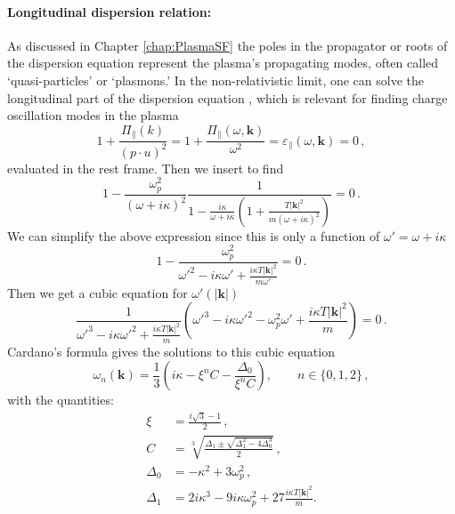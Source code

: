 \paragraph{Longitudinal dispersion relation:}
As discussed in Chapter \ref{chap:PlasmaSF} the poles in the propagator or roots of the dispersion equation represent the plasma's propagating modes, often called `quasi-particles' or `plasmons.' In the non-relativistic limit, one can solve the longitudinal part of the dispersion equation , which is relevant for finding charge oscillation modes in the plasma
\begin{equation}
    1+ \frac{\Pi_\parallel( k)}{(p\cdot u)^2}= 1+ \frac{\Pi_\parallel(\omega, \boldsymbol{k})}{\omega^2}=\varepsilon_\parallel(\omega,\boldsymbol{k}) =0 \,,
\end{equation}
evaluated in the rest frame. Then we insert  to find
\begin{equation}
   1- \frac{\omega_p^2}{(\omega+ i \kappa)^2} \frac{1}{1-\frac{i\kappa}{\omega+ i \kappa}\left(1+\frac{T |\boldsymbol{k}|^2}{m(\omega+ i \kappa)^2} \right)}=0 \,.
\end{equation}
We can simplify the above expression since this is only a function of $\omega' =\omega+i\kappa$
\begin{equation}
   1- \frac{\omega_p^2}{\omega'^2-i\kappa\omega'+\frac{i\kappa T |\boldsymbol{k}|^2}{m \omega'} }=0 \,.
\end{equation}
Then we get a cubic equation for $\omega'(|\boldsymbol{k}|)$
\begin{equation}\label{eq:dispfact}
   \frac{1}{\omega'^3-i\kappa\omega'^2+\frac{i\kappa T |\boldsymbol{k}|^2}{m} }
    \left(\omega'^3-i\kappa\omega'^2 - \omega_p^2\omega'+\frac{i\kappa T |\boldsymbol{k}|^2}{m} \right)=0 \,.
\end{equation}
Cardano's formula gives the solutions to this cubic equation
\begin{equation}\label{eq:cardano}
\omega_n(\boldsymbol{k}) = \frac{1}{3}\left(i\kappa-\xi^n C-\frac{\Delta_0}{\xi^n C}\right), \qquad n \in \{0,1,2\} \,,
\end{equation}
with the quantities:
\begin{align}\label{eq:delta}
  \xi &=\frac{i\sqrt{3}-1}{2}\,,\\
    C &= \sqrt[3]{\frac{\Delta_1 \pm \sqrt{\Delta_1^2 - 4 \Delta_0^3}}2}\,,\\
    \Delta_0 &= -\kappa^2 + 3 \omega_p^2\,,\\
\Delta_1 &= 2i\kappa^3 - 9 i\kappa \omega_p^2 + 27\frac{i\kappa T |\boldsymbol{k}|^2}{m}.
\end{align}
